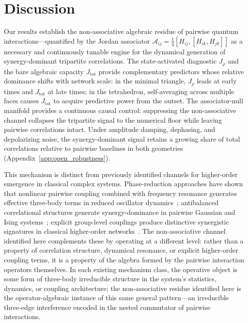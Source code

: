 \documentclass[aps,physrev,preprint,groupedaddress]{revtex4-2}
\begin{document}
\section{Discussion}

Our results establish the non-associative algebraic residue of pairwise quantum interactions—quantified by the Jordan associator $\mathcal{A}_{ij} = \tfrac{1}{4}[H_{ij}, [H_{ik}, H_{jk}]]$ as a necessary and continuously tunable engine for the dynamical generation of synergy-dominant tripartite correlations. The state-activated diagnostic $J_\rho$ and the bare algebraic capacity $J_{\mathrm{tot}}$ provide complementary predictors whose relative dominance shifts with network scale: in the minimal triangle, $J_\rho$ leads at early times and $J_{\mathrm{tot}}$ at late times; in the tetrahedron, self-averaging across multiple faces causes $J_{\mathrm{tot}}$ to acquire predictive power from the outset. The associator-null manifold provides a continuous causal control: suppressing the non-associative channel collapses the tripartite signal to the numerical floor while leaving pairwise correlations intact. Under amplitude damping, dephasing, and depolarizing noise, the synergy-dominant signal retains a growing share of total correlations relative to pairwise baselines in both geometries (Appendix~\ref{app:open_robustness}).

This mechanism is distinct from previously identified channels for higher-order emergence in classical complex systems. Phase-reduction approaches have shown that nonlinear pairwise coupling combined with frequency resonance generates effective three-body terms in reduced oscillator dynamics~\cite{nijholt2022EmergentHypernetworks}; antibalanced correlational structures generate synergy-dominance in pairwise Gaussian and Ising systems~\cite{caprioglio2026SynergisticMotifs, marinazzo2019SynergyWarning}; explicit group-level couplings produce distinctive synergistic signatures in classical higher-order networks~\cite{robiglio2025SynergisticSignatures}. The non-associative channel identified here complements these by operating at a different level: rather than a property of correlation structure, dynamical resonance, or explicit higher-order coupling terms, it is a property of the algebra formed by the pairwise interaction operators themselves. In each existing mechanism class, the operative object is some form of three-body irreducible structure in the system's statistics, dynamics, or coupling architecture; the non-associative residue identified here is the operator-algebraic instance of this same general pattern—an irreducible three-edge interference encoded in the nested commutator of pairwise interactions.
\end{document}
